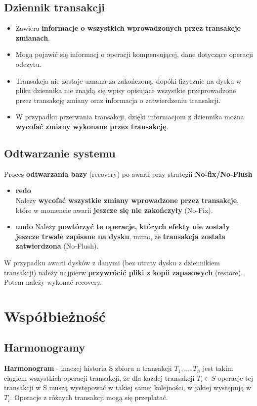 \documentclass[a4paper]{article}
\begin{document}
\subsection{Dziennik transakcji}
\begin{itemize}
    \item Zawiera \textbf{informacje o wszystkich wprowadzonych przez transakcje zmianach}.
    \item Mogą pojawić się informacj o operacji kompensującej, dane dotyczące operacji odczytu.
    \item Transakcja nie zostaje uznana za zakończoną, dopóki fizycznie na dysku w pliku dziennika nie znajdą się wpisy opisujące wszystkie przeprowadzone przez transakcję zmiany oraz informacja o zatwierdzeniu transakcji.
    \item W przypadku przerwania transakcji, dzięki informacjom z dziennika można \textbf{wycofać zmiany wykonane przez transakcję}.
\end{itemize}

\subsection{Odtwarzanie systemu}
Proces \textbf{odtwarzania bazy} (recovery) po awarii przy strategii \textbf{No-fix/No-Flush}
\begin{itemize}
    \item \textbf{redo}\\
     Należy \textbf{wycofać wszystkie zmiany wprowadzone przez transakcje}, które w momencie awarii \textbf{jeszcze się nie zakończyły} (No-Fix).
    \item \textbf{undo}
    Należy \textbf{powtórzyć te operacje, których efekty nie zostały jeszcze trwale zapisane na dysku}, mimo, że \textbf{transakcja została zatwierdzona} (No-Flush).
\end{itemize}

W przypadku awarii dysków z danymi (bez utraty dysku z dziennikiem transakcji) należy najpierw \textbf{przywrócić pliki z kopii zapasowych} (restore). Potem należy wykonać recovery.

\section{Współbieżność}
\subsection{Harmonogramy}
\textbf{Harmonogram} - inaczej historia S zbioru n transakcji $T_1, \dots, T_n$ jest takim ciągiem wszystkich operacji transakcji, że dla każdej transakcji $T_i \in S$ operacje tej transakcji w S muszą występować w takiej samej kolejności, w jakiej występują w $T_i$. Operacje z różnych transakcji mogą się przeplatać.
\end{document}
